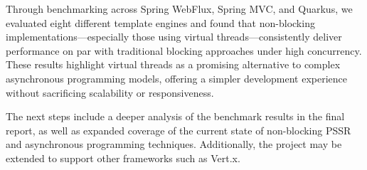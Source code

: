 \documentclass[../apG48.tex]{subfiles}
\begin{document}
Through benchmarking across Spring WebFlux, Spring MVC, and Quarkus, we evaluated eight different template engines and found that non-blocking implementations—especially those using virtual threads—consistently deliver performance on par with traditional blocking approaches under high concurrency. 
These results highlight virtual threads as a promising alternative to complex asynchronous programming models, offering a simpler development experience without sacrificing scalability or responsiveness.

The next steps include a deeper analysis of the benchmark results in the final report, as well as expanded coverage of the current state of non-blocking PSSR and asynchronous programming techniques. Additionally, the project may be extended to support other frameworks such as Vert.x.
\end{document}
